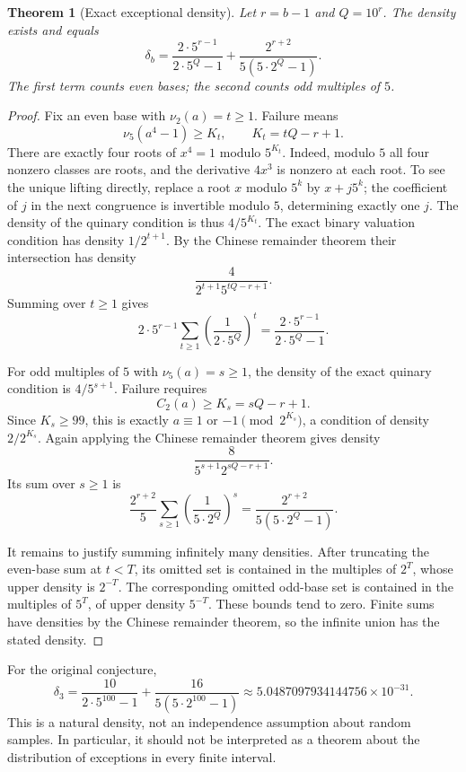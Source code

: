 \documentclass[11pt,a4paper]{article}
\newtheorem{theorem}{Theorem}[section]
\theoremstyle{definition}
\begin{document}
\begin{theorem}[Exact exceptional density]\label{thm:density}
Let $r=b-1$ and $Q=10^r$. The density exists and equals
\begin{equation}\label{eq:density}
\boxed{\displaystyle
\delta_b=
\frac{2\cdot5^{r-1}}{2\cdot5^Q-1}
+\frac{2^{r+2}}{5(5\cdot2^Q-1)}.}
\end{equation}
The first term counts even bases; the second counts odd multiples of $5$.
\end{theorem}
\begin{proof}
Fix an even base with $\nu_2(a)=t\ge1$. Failure means
\[
\nu_5(a^4-1)\ge K_t,\qquad K_t=tQ-r+1.
\]
There are exactly four roots of $x^4=1$ modulo $5^{K_t}$.
Indeed, modulo $5$ all four nonzero classes are roots, and the derivative
$4x^3$ is nonzero at each root. To see the unique lifting directly, replace
a root $x$ modulo $5^k$ by $x+j5^k$; the coefficient of $j$ in the next
congruence is invertible modulo $5$, determining exactly one $j$.
The density of the quinary condition is thus $4/5^{K_t}$.
The exact binary valuation condition has density $1/2^{t+1}$.
By the Chinese remainder theorem their intersection has density
\[
\frac{4}{2^{t+1}5^{tQ-r+1}}.
\]
Summing over $t\ge1$ gives
\[
2\cdot5^{r-1}\sum_{t\ge1}\left(\frac1{2\cdot5^Q}\right)^t
=\frac{2\cdot5^{r-1}}{2\cdot5^Q-1}.
\]

For odd multiples of $5$ with $\nu_5(a)=s\ge1$, the density of the exact
quinary condition is $4/5^{s+1}$. Failure requires
\[
C_2(a)\ge K_s=sQ-r+1.
\]
Since $K_s\ge99$, this is exactly $a\equiv1$ or $-1\pmod{2^{K_s}}$,
a condition of density $2/2^{K_s}$. Again applying the Chinese remainder
theorem gives density
\[
\frac{8}{5^{s+1}2^{sQ-r+1}}.
\]
Its sum over $s\ge1$ is
\[
\frac{2^{r+2}}5\sum_{s\ge1}\left(\frac1{5\cdot2^Q}\right)^s
=\frac{2^{r+2}}{5(5\cdot2^Q-1)}.
\]

It remains to justify summing infinitely many densities. After truncating
the even-base sum at $t<T$, its omitted set is contained in the multiples
of $2^T$, whose upper density is $2^{-T}$. The corresponding omitted
odd-base set is contained in the multiples of $5^T$, of upper density
$5^{-T}$. These bounds tend to zero. Finite sums have densities by the
Chinese remainder theorem, so the infinite union has the stated density.
\end{proof}

For the original conjecture,
\begin{equation}\label{eq:density3}
\delta_3=
\frac{10}{2\cdot5^{100}-1}
+\frac{16}{5(5\cdot2^{100}-1)}
\approx5.0487097934144756\times10^{-31}.
\end{equation}
This is a natural density, not an independence assumption about random
samples. In particular, it should not be interpreted as a theorem about
the distribution of exceptions in every finite interval.
\end{document}
